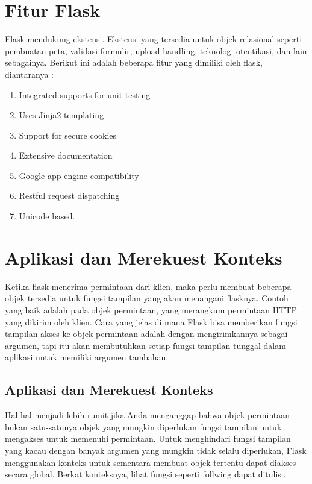 \section{Fitur Flask}
Flask mendukung ekstensi. Ekstensi yang tersedia untuk objek relasional seperti pembuatan peta,
validasi formulir, upload handling, teknologi otentikasi, dan lain sebagainya. Berikut ini adalah beberapa
fitur yang dimiliki oleh flask, diantaranya :
\begin{enumerate}
  \item Integrated supports for unit testing
  \item Uses Jinja2 templating
  \item Support for secure cookies
  \item Extensive documentation
  \item Google app engine compatibility
  \item Restful request dispatching
  \item Unicode based\cite{lokhande2015efficient}.
\end{enumerate}

\section{Aplikasi dan Merekuest Konteks}
Ketika flask menerima permintaan dari klien, maka perlu membuat beberapa objek tersedia untuk fungsi tampilan yang akan menangani flasknya. Contoh yang baik adalah pada objek permintaan, yang merangkum permintaan HTTP yang dikirim oleh klien. Cara yang jelas di mana Flask bisa memberikan fungsi tampilan akses ke objek permintaan adalah dengan mengirimkannya sebagai argumen, tapi itu akan membutuhkan setiap fungsi tampilan tunggal dalam aplikasi untuk memiliki argumen tambahan\cite{grinberg2018flask}.

\subsection{Aplikasi dan Merekuest Konteks}
Hal-hal menjadi lebih rumit jika Anda menganggap bahwa objek permintaan bukan satu-satunya objek yang mungkin diperlukan fungsi tampilan untuk mengakses untuk memenuhi permintaan. Untuk menghindari fungsi tampilan yang kacau dengan banyak argumen yang mungkin tidak selalu diperlukan, Flask menggunakan konteks untuk sementara membuat objek tertentu dapat diakses secara global. Berkat konteksnya, lihat fungsi seperti follwing dapat ditulis:\cite{grinberg2018flask}.

